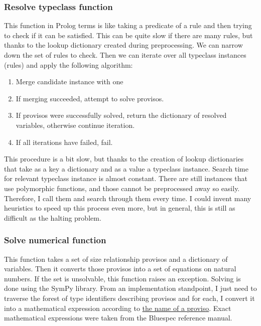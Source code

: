 \documentclass[12pt]{report}
\begin{document}
\subsubsection{Resolve typeclass function}
This function in Prolog terms is like taking a predicate of a rule and then trying to check if it can be satisfied. This can be quite slow if there are many rules, but thanks to the lookup dictionary created during preprocessing. We can narrow down the set of rules to check. 
Then we can iterate over all typeclass instances (rules) and apply the following algorithm: 
\begin{enumerate}  
   \item Merge candidate instance with one  
   \item If merging succeeded, attempt to solve provisos. 
   \item If provisos were successfully solved, return the dictionary of resolved variables, otherwise continue iteration. 
   \item If all iterations have failed, fail. 
\end{enumerate} 
This procedure is a bit slow, but thanks to the creation of lookup dictionaries that take as a key a dictionary and as a value a typeclass instance. Search time for relevant typeclass instance is almost constant. There are still instances that use polymorphic functions, and those cannot be preprocessed away so easily. Therefore, I call them  and search through them every time. I could invent many heuristics to speed up this process even more, but in general, this is still as difficult as the halting problem. 

\subsubsection{Solve numerical function} 

This function takes a set of size relationship provisos and a dictionary of variables. Then it converts those provisos into a set of equations on natural numbers. If the set is unsolvable, this function raises an exception. Solving is done using the SymPy library. 
From an implementation standpoint, I just need to traverse the forest of type identifiers describing provisos and for each, I convert it into a mathematical expression according to \hyperref[sec:Provisos]{the name of a proviso}. Exact mathematical expressions were taken from the Bluespec reference manual\cite{BscReference}. 
\end{document}
